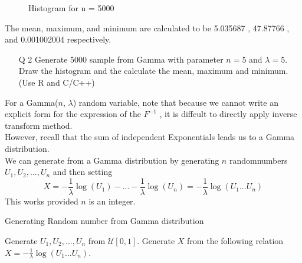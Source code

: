 \documentclass[11pt]{article}
\begin{document}
\begin{figure}[H]
  \centering
    \caption{Histogram for n = 5000}
\end{figure}

The mean, maximum, and minimum are calculated to be 5.035687 , 47.87766 , and 0.001002004 respectively.

\newpage

\begin{enumerate}
\item[Q 2] Generate 5000 sample from Gamma with parameter $n = 5$ and $\lambda = 5$.
Draw the histogram and the calculate the mean, maximum and minimum.
(Use R and C/C++)
\end{enumerate}

  For a Gamma($n$, $\lambda$) random variable, note that because we cannot write an explicit form for the expression of the $F^{-1}$ , it is diffcult to directly apply inverse transform method.\\
However, recall that the sum of independent Exponentials leads us to a Gamma distribution.\\
We can generate from a Gamma distribution by generating $n$ randomnumbers $U_1, U_2, ..., U_n$ and then setting%
$$X = -\frac{1}{\lambda}\log(U_1) - ... -\frac{1}{\lambda}\log(U_n) = -\frac{1}{\lambda}\log(U_1 ... U_n)$$
This works provided $n$ is an integer.

\begin{algorithm}[H]
\caption{Generating Random number from Gamma distribution}
\begin{algorithmic}[1]
\STATE Generate $U_1, U_2, ..., U_n$ from $\mathcal{U}[0,1]$.
\STATE Generate $X$ from the following relation $X = -\frac{1}{\lambda}\log(U_1 ... U_n)$.
\end{algorithmic}
\end{algorithm}
\end{document}
